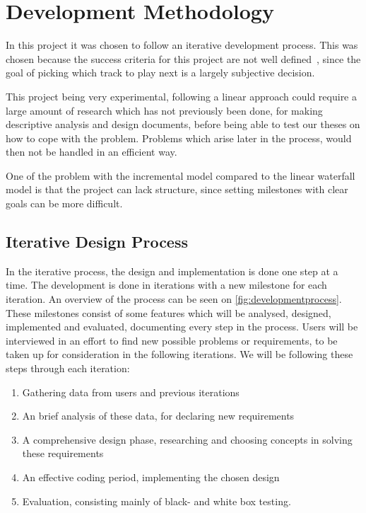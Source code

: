 \chapter{Development Methodology}

In this project it was chosen to follow an iterative development process. This was chosen because the success criteria for this project are not well defined~\cite{dahlbom1993computers}, since the goal of picking which track to play next is a largely subjective decision.

This project being very experimental, following a linear approach could require a large amount of research which has not previously been done, for making descriptive analysis and design documents, before being able to test our theses on how to cope with the problem. Problems which arise later in the process, would then not be handled in an efficient way.

One of the problem with the incremental model compared to the linear waterfall model is that the project can lack structure, since setting milestones with clear goals can be more difficult.

\section{Iterative Design Process}
In the iterative process, the design and implementation is done one step at a time. The development is done in iterations with a new milestone for each iteration. An overview of the process can be seen on \cref{fig:developmentprocess}. These milestones consist of some features which will be analysed, designed, implemented and evaluated, documenting every step in the process. Users will be interviewed in an effort to find new possible problems or requirements, to be taken up for consideration in the following iterations. We will be following these steps through each iteration:

\begin{enumerate}
  \item Gathering data from users and previous iterations
  \item An brief analysis of these data, for declaring new requirements
  \item A comprehensive design phase, researching and choosing concepts in solving these requirements
  \item An effective coding period, implementing the chosen design
  \item Evaluation, consisting mainly of black- and white box testing.
\end{enumerate}

